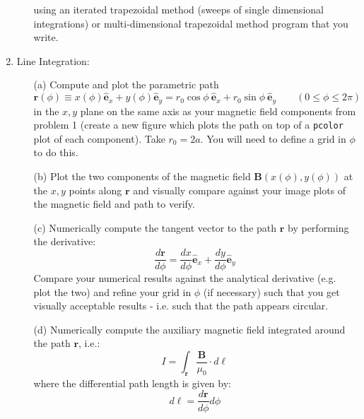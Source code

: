 \documentclass{article}
\begin{document}
\begin{enumerate}
\begin{itemize}
    using an iterated trapezoidal method (sweeps of single dimensional integrations) or multi-dimensional trapezoidal method program that you write.  
  \end{itemize}
  \item Line Integration:  
  \begin{itemize}
    \item[(a)]  Compute and plot the parametric path
    \begin{equation}
       \mathbf{r}(\phi) \equiv x(\phi)\hat{\mathbf{e}}_x + y(\phi)\hat{\mathbf{e}}_y = r_0 \cos \phi ~ \hat{\mathbf{e}}_x + r_0 \sin \phi ~ \hat{\mathbf{e}}_y \qquad (0 \le \phi \le 2 \pi)
    \end{equation}    
    in the $x,y$ plane on the same axis as your magnetic field components from problem 1 (create a new figure which plots the path on top of a \texttt{pcolor} plot of each component).  Take $r_0 = 2a$.  You will need to define a grid in $\phi$ to do this.
    \item[(b)]  Plot the two components of the magnetic field $\mathbf{B}(x(\phi),y(\phi))$ at the $x,y$ points along $\mathbf{r}$ and visually compare against your image plots of the magnetic field and path to verify.  
    \item[(c)]  Numerically compute the tangent vector to the path $\mathbf{r}$ by performing the derivative:  
    \begin{equation}
      \frac{d \mathbf{r}}{d \phi} =  \frac{d x}{d \phi} \hat{\mathbf{e}}_x + \frac{d y}{d \phi} \hat{\mathbf{e}}_y
    \end{equation}
    Compare your numerical results against the analytical derivative (e.g. plot the two) and refine your grid in $\phi$ (if necessary) such that you get visually acceptable results - i.e. such that the path appears circular.  
    \item[(d)]  Numerically compute the auxiliary magnetic field integrated around the path $\mathbf{r}$, i.e.:
    \begin{equation}
       I = \int_{\mathbf{r}} \frac{\mathbf{B}}{\mu_0} \cdot d \boldsymbol{\ell} 
    \end{equation}
    where the differential path length is given by:
    \begin{equation}
      d \boldsymbol{\ell} = \frac{d \mathbf{r}}{d \phi} d \phi 
    \end{equation}   
  \end{itemize}
\end{enumerate}
\end{document}
